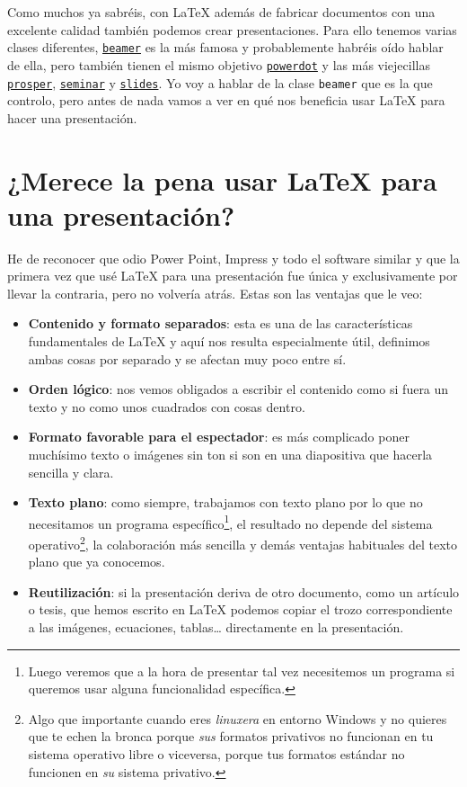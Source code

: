 Como muchos ya sabréis, con LaTeX además de fabricar documentos con una
excelente calidad también podemos crear presentaciones. Para ello
tenemos varias clases diferentes,
\href{https://www.ctan.org/pkg/beamer}{\lstinline!beamer!} es la más
famosa y probablemente habréis oído hablar de ella, pero también tienen
el mismo objetivo
\href{http://www.ctan.org/pkg/powerdot/}{\lstinline!powerdot!} y las más
viejecillas \href{http://www.ctan.org/pkg/prosper}{\lstinline!prosper!},
\href{https://www.ctan.org/pkg/seminar}{\lstinline!seminar!} y
\href{http://www.ctan.org/pkg/slides}{\lstinline!slides!}. Yo voy a
hablar de la clase \lstinline!beamer! que es la que controlo, pero antes
de nada vamos a ver en qué nos beneficia usar LaTeX para hacer una
presentación.

\section{¿Merece la pena usar LaTeX para una
presentación?}

He de reconocer que odio Power Point, Impress y todo el software similar
y que la primera vez que usé LaTeX para una presentación fue única y
exclusivamente por llevar la contraria, pero no volvería atrás. Estas
son las ventajas que le veo:

\begin{itemize}
\item
  \textbf{Contenido y formato separados}: esta es una de las
  características fundamentales de LaTeX y aquí nos resulta
  especialmente útil, definimos ambas cosas por separado y se afectan
  muy poco entre sí.
\item
  \textbf{Orden lógico}: nos vemos obligados a escribir el contenido
  como si fuera un texto y no como unos cuadrados con cosas dentro.
\item
  \textbf{Formato favorable para el espectador}: es más complicado poner
  muchísimo texto o imágenes sin ton si son en una diapositiva que
  hacerla sencilla y clara.
\item
  \textbf{Texto plano}: como siempre, trabajamos con texto plano por lo
  que no necesitamos un programa específico\footnote{Luego veremos que a
    la hora de presentar tal vez necesitemos un programa si queremos
    usar alguna funcionalidad específica.}, el resultado no depende del
  sistema operativo\footnote{Algo que importante cuando eres
    \emph{linuxera} en entorno Windows y no quieres que te echen la
    bronca porque \emph{sus} formatos privativos no funcionan en tu
    sistema operativo libre o viceversa, porque tus formatos estándar no
    funcionen en \emph{su} sistema privativo.}, la colaboración más
  sencilla y demás ventajas habituales del texto plano que ya conocemos.
\item
  \textbf{Reutilización}: si la presentación deriva de otro documento,
  como un artículo o tesis, que hemos escrito en LaTeX podemos copiar el
  trozo correspondiente a las imágenes, ecuaciones, tablas\ldots{}
  directamente en la presentación.
\end{itemize}

